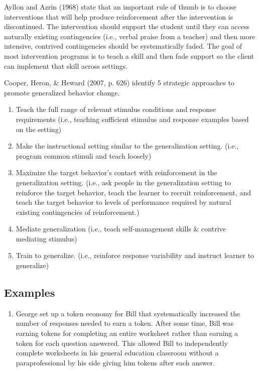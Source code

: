 Ayllon and Azrin (1968) state that an important rule of thumb is to choose interventions that will help produce reinforcement after the intervention is discontinued. The intervention should support the student until they can access naturally existing contingencies (i.e., verbal praise from a teacher) and then more intensive, contrived contingencies should be systematically faded. The goal of most intervention programs is to teach a skill and then fade support so the client can implement that skill across settings. 

Cooper, Heron, \& Heward (2007, p. 626) identify 5 strategic approaches to promote generalized behavior change.
\begin{enumerate}
\item Teach the full range of relevant stimulus conditions and response requirements (i.e., teaching sufficient stimulus and response examples based on the setting)
\item Make the instructional setting similar to the generalization setting. (i.e., program common stimuli and teach loosely)
\item Maximize the target behavior's contact with reinforcement in the generalization setting. (i.e., ask people in the generalization setting to reinforce the target behavior, teach the learner to recruit reinforcement, and teach the target behavior to levels of performance required by natural existing contingencies of reinforcement.)
\item Mediate generalization (i.e., teach self-management skills \& contrive mediating stimulus)
\item Train to generalize. (i.e., reinforce response variability and instruct learner to generalize)
\end{enumerate}
%
\subsection{Examples}
\begin{enumerate}
\item George set up a token economy for Bill that systematically increased the number of responses needed to earn a token. After some time, Bill was earning tokens for completing an entire worksheet rather than earning a token for each question answered. This allowed Bill to independently complete worksheets in his general education classroom without a paraprofessional by his side giving him tokens after each answer. 
%
\end{enumerate}
%
